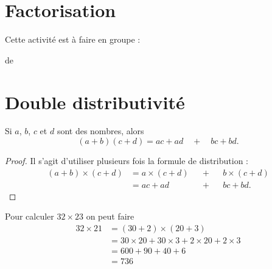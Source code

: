 

\section{Factorisation}



Cette activité est à faire en groupe :

de \cite{ZGRKooSUSPix}

\section{Double distributivité}



\begin{propriete}
    Si \( a\), \( b\), \( c\) et \( d\) sont des nombres, alors
    \begin{equation}
        (a+b)(c+d)=ac+ad\quad+\quad bc+bd.
    \end{equation}
\end{propriete}

\begin{proof}
    Il s'agit d'utiliser plusieurs fois la formule de distribution :
    \begin{subequations}
        \begin{align}
            (a+b)\times \boxed{(c+d)}&=a\times \boxed{(c+d)}&&+&& b\times \boxed{(c+d)}\\
            &=ac+ad  &&+&&bc+bd.
        \end{align}
    \end{subequations}
\end{proof}

\begin{example}
    Pour calculer \( 32\times 23 \) on peut faire
    \begin{subequations}
        \begin{align}
                32\times 21&=(30+2)\times (20+3)\\
                &=30\times 20+30\times 3+2\times 20+2\times 3\\
                &=600+90+40+6\\
                &=736
        \end{align}
    \end{subequations}
\end{example}

